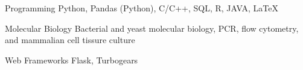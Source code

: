

\begin{cvskills}

  \cvskill
  {Programming} %
  {Python, Pandas (Python), C/C++, SQL, R, JAVA, LaTeX} %


  \cvskill
  {Molecular Biology} %
  {Bacterial and yeast molecular biology, PCR, flow cytometry, and mammalian cell tissure culture} %

  \cvskill
  {Web Frameworks} %
  {Flask, Turbogears} %

\end{cvskills}
